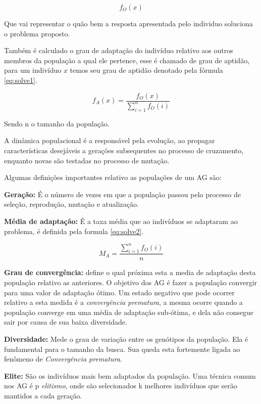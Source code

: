 \begin{equation} \label{eq:solve0}
f_O(x)  
\end{equation}


Que vai representar o quão bem a resposta apresentada pelo individuo soluciona o problema proposto.

Também é calculado o grau de adaptação do indivíduo relativo aos outros membros da população a qual ele pertence, esse é chamado de grau de aptidão, para um indivíduo $x$ temos seu grau de aptidão denotado pela fórmula \ref{eq:solve1}.


\begin{equation} \label{eq:solve1}
    f_A(x) = \frac{f_O(x)}{ \sum_{i=1}^{n}  f_O(i)  }  
\end{equation}

 Sendo n o tamanho da população.
 
 A dinâmica populacional é a responsável pela evolução, ao propagar características desejáveis a gerações subsequentes no processo de cruzamento, enquanto novas são testadas no processo de mutação.
 
 Algumas definições importantes relativo as populações de um AG são:
 
 \textbf{Geração:} É o número de vezes em que a população passou pelo processo de seleção, reprodução, mutação e atualização.

\textbf{Média de adaptação:} É a taxa média que ao indivíduos se adaptaram ao problema, é definida pela formula \ref{eq:solve2}. 

\begin{equation} \label{eq:solve2}
M_A = \frac{ \sum_{i=1}^{n} f_O(i) }{n}
\end{equation}


\textbf{Grau de convergência:} define o qual próxima esta a media de adaptação desta população relativo as anteriores. O objetivo dos AG é fazer a população convergir para uma valor de adaptação ótimo.
Um estado negativo que pode ocorrer relativo a esta medida é a \textit{convergência prematura}, a mesma ocorre quando a população converge em uma média de adaptação sub-ótima, e dela não consegue sair por causa de sua baixa diversidade.

\textbf{Diversidade:} Mede o grau de variação entre os genótipos da população. Ela é fundamental para o tamanho da busca.
Sua queda esta fortemente ligada ao fenômeno de \textit{Convergência prematura}.

\textbf{Elite:} São os indivíduos mais bem adaptados da população. Uma técnica comum nos AG é p \textit{elitismo}, onde são selecionados k melhores indivíduos que serão mantidos a cada geração.


